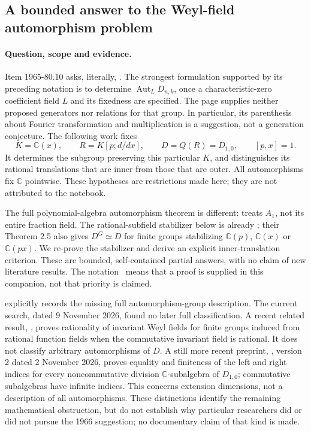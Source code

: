 \subsection{A bounded answer to the Weyl-field automorphism problem}
\label{dev:weyl}

\paragraph{Question, scope and evidence.}
Item 1965-80.10 asks, literally, .
The strongest formulation supported by its preceding notation is to determine
\(\operatorname{Aut}_{L}D_{n,k}\), once a characteristic-zero coefficient field
\(L\) and its fixedness are specified. The page supplies neither proposed
generators nor relations for that group. In particular, its parenthesis about
Fourier transformation and multiplication is a suggestion, not a generation
conjecture. The following work fixes
\[
 K=\mathbb C(x),\qquad R=K[p;d/dx],\qquad
 D=Q(R)=D_{1,0},\qquad [p,x]=1.
\]
It determines the subgroup preserving this particular \(K\), and distinguishes
its rational translations that are inner from those that are outer. All
automorphisms fix \(\mathbb C\) pointwise. These hypotheses are restrictions
made here; they are not attributed to the notebook.

The full polynomial-algebra automorphism theorem is different:
\citet[Theorem 2]{makarlimanov1984automorphisms} treats \(A_1\), not its entire
fraction field. The rational-subfield stabilizer below is already
\citet[Proposition 2.2(i)]{alevdumas1998invariants}; their Theorem 2.5 also gives
\(D^G\simeq D\) for finite groups stabilizing \(\mathbb C(p)\), \(\mathbb C(x)\)
or \(\mathbb C(px)\). We re-prove the stabilizer and derive an explicit
inner-translation criterion. These are bounded, self-contained partial
answers, with no claim of new literature results. The notation \ours\ means
that a proof is supplied in this companion, not that priority is claimed.

\citet[\S5.3.3]{dumas2011invariants} explicitly records the missing full
automorphism-group description. The current search, dated 9 November 2026,
found no later full classification. A recent related result,
\citet[Theorem 0.12]{schwarz2024generalizations}, proves rationality of invariant
Weyl fields for finite groups induced from rational function fields when the
commutative invariant field is rational. It does not classify arbitrary
automorphisms of \(D\). A still more recent preprint,
\citet[Corollary 8.12]{lauritzenthomsen2026duality}, version 2 dated
2 November 2026, proves equality and finiteness of the left and right
indices for every noncommutative division \(\mathbb C\)-subalgebra of
\(D_{1,0}\); commutative subalgebras have infinite indices. This concerns
extension dimensions, not a description of all automorphisms.
These distinctions identify the remaining mathematical obstruction,
but do not establish why particular researchers did or did not pursue the
1966 suggestion; no documentary claim of that kind is made.

